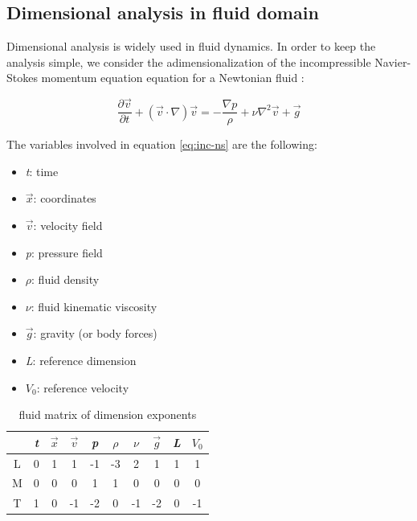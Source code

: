 \subsection{Dimensional analysis in fluid domain}
\label{sec:dim-fluid}

Dimensional analysis is widely used in fluid dynamics. In order to keep the analysis simple, we consider the adimensionalization of the incompressible Navier-Stokes momentum equation equation for a Newtonian fluid \cite{fox2020fox}:

\begin{equation}
	\frac{\partial \vec{v}}{\partial t} + \left(\vec{v} \cdot \nabla \right) \vec{v} = -\frac{\nabla p}{\rho} + \nu \nabla ^2 \vec{v} + \vec{g}
	\label{eq:inc-ns}
\end{equation}

The variables involved in equation \ref{eq:inc-ns} are the following:

\begin{itemize}
	\item \textit{t}: time
	\item $\vec{x}$: coordinates
	\item $\vec{v}$: velocity field
	\item \textit{p}: pressure field
	\item $\rho$: fluid density
	\item $\nu$: fluid kinematic viscosity
	\item $\vec{g}$: gravity (or body forces)
	\item \textit{L}: reference dimension
	\item $V_0$: reference velocity
\end{itemize}




\begin{table}[!h]
\begin{center}
	\begin{tabular}{ c|c c c c c c c c c} 
		  & \textit{t} & $\vec{x}$ & $\vec{v}$ & \textit{p} & $\rho$ & $\nu$ & $\vec{g}$ & \textit{L} & $V_0$  \\ 
		\hline
		L & 0 & 1 & 1  & -1 & -3 & 2  & 1  & 1 & 1  \\ 
		M & 0 & 0 & 0  &  1 &  1 & 0  & 0  & 0 & 0  \\
		T & 1 & 0 & -1 & -2 &  0 & -1 & -2 & 0 & -1 \\ 
	\end{tabular}
\end{center}
\caption{fluid  matrix of dimension exponents}
\label{table:dim-fluid}
\end{table}

